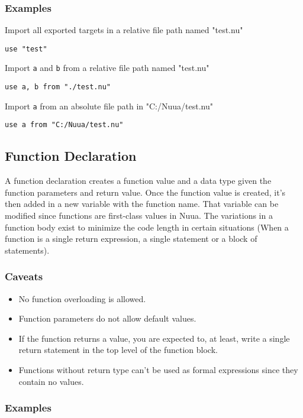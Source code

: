 \subsubsection{Examples}

Import all exported targets in a relative file path named "test.nu"
\begin{lstlisting}
use "test"
\end{lstlisting}
Import \texttt{a} and \texttt{b} from a relative file path named "test.nu"
\begin{lstlisting}
use a, b from "./test.nu"
\end{lstlisting}
Import \texttt{a} from an absolute file path in "C:/Nuua/test.nu"
\begin{lstlisting}
use a from "C:/Nuua/test.nu"
\end{lstlisting}

\subsection{Function Declaration}
\label{sec:statements_function}

A function declaration creates a function value and a data type given the function parameters and return value.
Once the function value is created, it's then added in a new variable with the function name. That variable can be
modified since functions are first-class values in Nuua. The variations in a function body exist to minimize the
code length in certain situations (When a function is a single return expression, a single statement or a block of statements).

\subsubsection{Caveats}

\begin{itemize}
    \item No function overloading is allowed.
    \item Function parameters do not allow default values.
    \item If the function returns a value, you are expected to, at least, write a single return statement in the top level of the
        function block.
    \item Functions without return type can't be used as formal expressions since they contain no values.
\end{itemize}

\subsubsection{Examples}

